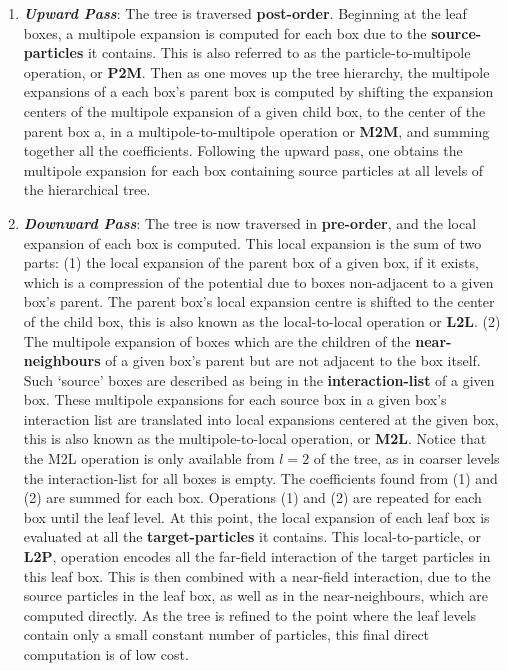 \begin{enumerate}
    \item \textbf{\textit{Upward Pass}}: The tree is traversed \textbf{\gls{post-order}}.
    Beginning at the leaf boxes, a multipole expansion is computed for each box
    due to the \textbf{\gls{source-particles}} it contains. This is also referred to as the particle-to-multipole
    operation, or \textbf{\gls{P2M}}. Then as one moves up the tree hierarchy, the
    multipole expansions of a each box's parent box is computed by shifting the
    expansion centers of the multipole expansion of a given child box, to the center
    of the parent box a, in a multipole-to-multipole operation or \textbf{\gls{M2M}},
    and summing together all the coefficients. Following the upward pass, one
    obtains the multipole expansion for each box containing source particles at
    all levels of the hierarchical tree.
    \item \textbf{\textit{Downward Pass}}: The tree is now traversed in
    \textbf{\gls{pre-order}}, and the local expansion of each box is computed.
    This local expansion is the sum of two parts: (1) the local expansion of the
    parent box of a given box, if it exists, which is a compression of the potential due to boxes
    non-adjacent to a given box's parent. The parent box's local expansion centre
    is shifted to the center of the child box, this is also known as the local-to-local
    operation or \textbf{\gls{L2L}}. (2) The multipole expansion of boxes which
    are the children of the \textbf{\gls{near-neighbours}} of a given box's
    parent but are not adjacent to the box itself. Such `source' boxes are described
    as being in the \textbf{\gls{interaction-list}} of a given box. These multipole
    expansions for each source box in a given box's interaction list are translated into local expansions centered at
    the given box, this is also known as
    the multipole-to-local operation, or \textbf{\gls{M2L}}. Notice that the
    \gls{M2L} operation is only available from $l=2$ of the tree, as in coarser
    levels the \gls{interaction-list} for all boxes is empty. The coefficients found
    from (1) and (2) are summed for each box. Operations (1) and (2) are repeated for each
    box until the leaf level. At this point, the local expansion
    of each leaf box is evaluated at all the \textbf{\gls{target-particles}} it contains.
    This local-to-particle, or \textbf{\gls{L2P}}, operation encodes all the \gls{far-field}
    interaction of the target particles in this leaf box. This is then combined with
    a \gls{near-field} interaction, due to the source particles in the leaf box,
    as well as in the \gls{near-neighbours}, which are computed directly. As the
    tree is refined to the point where the leaf levels contain only a small constant
    number of particles, this final direct computation is of low cost.
\end{enumerate}


